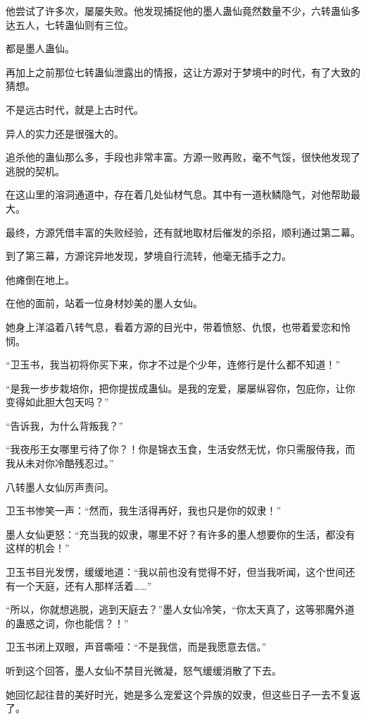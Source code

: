 \begin{this_body}
他尝试了许多次，屡屡失败。他发现捕捉他的墨人蛊仙竟然数量不少，六转蛊仙多达五人，七转蛊仙则有三位。

都是墨人蛊仙。

再加上之前那位七转蛊仙泄露出的情报，这让方源对于梦境中的时代，有了大致的猜想。

不是远古时代，就是上古时代。

异人的实力还是很强大的。

追杀他的蛊仙那么多，手段也非常丰富。方源一败再败，毫不气馁，很快他发现了逃脱的契机。

在这山里的溶洞通道中，存在着几处仙材气息。其中有一道秋鳞隐气，对他帮助最大。

最终，方源凭借丰富的失败经验，还有就地取材后催发的杀招，顺利通过第二幕。

到了第三幕，方源诧异地发现，梦境自行流转，他毫无插手之力。

他瘫倒在地上。

在他的面前，站着一位身材妙美的墨人女仙。

她身上洋溢着八转气息，看着方源的目光中，带着愤怒、仇恨，也带着爱恋和怜悯。

“卫玉书，我当初将你买下来，你才不过是个少年，连修行是什么都不知道！”

“是我一步步栽培你，把你提拔成蛊仙。是我的宠爱，屡屡纵容你，包庇你，让你变得如此胆大包天吗？”

“告诉我，为什么背叛我？”

“我夜彤王女哪里亏待了你？！你是锦衣玉食，生活安然无忧，你只需服侍我，而我从未对你冷酷残忍过。”

八转墨人女仙厉声责问。

卫玉书惨笑一声：“然而，我生活得再好，我也只是你的奴隶！”

墨人女仙更怒：“充当我的奴隶，哪里不好？有许多的墨人想要你的生活，都没有这样的机会！”

卫玉书目光发愣，缓缓地道：“我以前也没有觉得不好，但当我听闻，这个世间还有一个天庭，还有人那样活着……”

“所以，你就想逃脱，逃到天庭去？”墨人女仙冷笑，“你太天真了，这等邪魔外道的蛊惑之词，你也能信？！”

卫玉书闭上双眼，声音嘶哑：“不是我信，而是我愿意去信。”

听到这个回答，墨人女仙不禁目光微凝，怒气缓缓消散了下去。

她回忆起往昔的美好时光，她是多么宠爱这个异族的奴隶，但这些日子一去不复返了。


\end{this_body}
